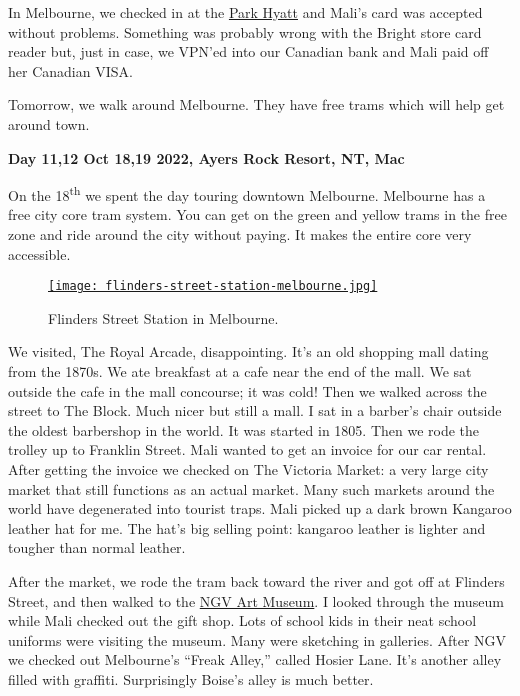In Melbourne, we checked in at the
\href{https://www.hyatt.com/en-US/hotel/australia/park-hyatt-melbourne/melph}{Park
Hyatt} and Mali's card was accepted without problems. Something was
probably wrong with the Bright store card reader but, just in case, we
VPN'ed into our Canadian bank and Mali paid off her Canadian VISA.

Tomorrow, we walk around Melbourne. They have free trams which will help
get around town.

\textbf{Day 11,12 Oct 18,19 2022, Ayers Rock Resort, NT, Mac}

On the 18\textsuperscript{th} we spent the day touring downtown
Melbourne. Melbourne has a free city core tram system. You can get on
the green and yellow trams in the free zone and ride around the city
without paying. It makes the entire core very accessible.


\captionsetup[figure]{labelformat=empty}
\begin{SCfigure}[10]
\centering
\href{https://conceptcontrol.smugmug.com/Trips/Overseas/Australia-New-Zealand-2022/i-gzRJZgc/A}{\texttt{[image: flinders-street-station-melbourne.jpg]}}
\caption[Flinders Street Station in Melbourne]{Flinders Street Station in Melbourne.}
\label{fig:7573x1}
\end{SCfigure}

We visited, The Royal Arcade, disappointing. It's an old shopping mall
dating from the 1870s. We ate breakfast at a cafe near the end of the
mall. We sat outside the cafe in the mall concourse; it was cold! Then
we walked across the street to The Block. Much nicer but still a mall. I
sat in a barber's chair outside the oldest barbershop in the world. It
was started in 1805. Then we rode the trolley up to Franklin Street.
Mali wanted to get an invoice for our car rental. After getting the
invoice we checked on The Victoria Market: a very large city market that
still functions as an actual market. Many such markets around the world
have degenerated into tourist traps. Mali picked up a dark brown
Kangaroo leather hat for me. The hat's big selling point: kangaroo
leather is lighter and tougher than normal leather.

After the market, we rode the tram back toward the river and got off at
Flinders Street, and then walked to the
\href{https://www.ngv.vic.gov.au/}{NGV Art Museum}. I looked through the
museum while Mali checked out the gift shop. Lots of school kids in
their neat school uniforms were visiting the museum. Many were sketching
in galleries. After NGV we checked out Melbourne's ``Freak Alley,''
called Hosier Lane. It's another alley filled with graffiti.
Surprisingly Boise's alley is much better.

